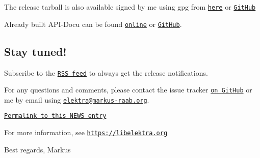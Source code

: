 The release tarball is also available signed by me using gpg from \href{https://www.libelektra.org/ftp/elektra/releases/elektra-0.8.20.tar.gz.gpg}{\tt here} or \href{https://github.com/ElektraInitiative/ftp/blob/master/releases//elektra-0.8.20.tar.gz.gpg?raw=true}{\tt Git\+Hub}

Already built A\+P\+I-\/\+Docu can be found \href{https://doc.libelektra.org/api/0.8.20/html/}{\tt online} or \href{https://github.com/ElektraInitiative/doc/tree/master/api/0.8.20}{\tt Git\+Hub}.

\subsection*{Stay tuned!}

Subscribe to the \href{https://www.libelektra.org/news/feed.rss}{\tt R\+SS feed} to always get the release notifications.

For any questions and comments, please contact the issue tracker \href{http://issues.libelektra.org}{\tt on Git\+Hub} or me by email using \href{mailto:elektra@markus-raab.org}{\tt elektra@markus-\/raab.\+org}.

\href{https://www.libelektra.org/news/0.8.20-release}{\tt Permalink to this N\+E\+WS entry}

For more information, see \href{https://libelektra.org}{\tt https\+://libelektra.\+org}

Best regards, Markus 